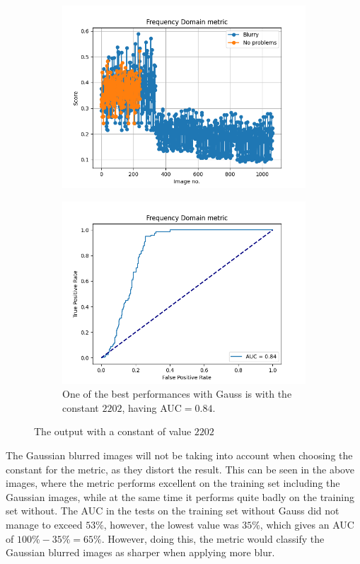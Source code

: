 \begin{figure}[H]
    \begin{subfigure}[t]{0.48\textwidth}
        \includegraphics[width=\textwidth]{Figures/BlurredImages/tweakFM/2202_output_basic_gauss.png}
        \caption{}
        \label{fig:FM_basic_gauss_2202}
    \end{subfigure}\hspace{1em}
    \begin{subfigure}[t]{0.48\textwidth}
        \includegraphics[width=\textwidth]{Figures/BlurredImages/tweakFM/2202_output_roc_gauss.png}
        \caption{One of the best performances with Gauss is with the constant $2202$, having AUC$=0.84$.}
        \label{fig:FM_roc_gauss_2202}
    \end{subfigure}
    \caption{The output with a constant of value $2202$}
\end{figure}
The Gaussian blurred images will not be taking into account when choosing the constant for the metric, as they distort the result. This can be seen in the above images, where the metric performs excellent on the training set including the Gaussian images, while at the same time it performs quite badly on the training set without. The AUC in the tests on the training set without Gauss did not manage to exceed $53\%$, however, the lowest value was $35\%$, which gives an AUC of $100\%-35\%=65\%$. However, doing this, the metric would classify the Gaussian blurred images as sharper when applying more blur.


